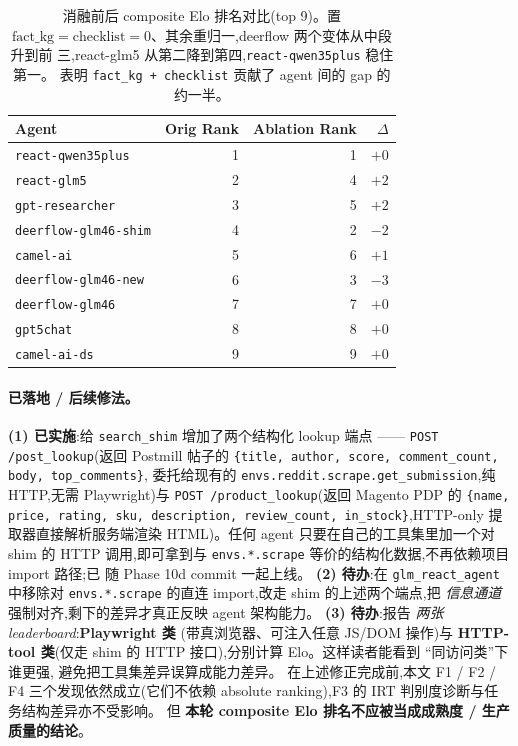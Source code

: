 \documentclass[UTF8,11pt]{ctexart}
\begin{document}
\begin{table}[h]
  \centering
  \small
  \begin{tabular}{lrrr}
    \toprule
    Agent & Orig Rank & Ablation Rank & $\Delta$ \\
    \midrule
    \texttt{react-qwen35plus}    & 1 & 1 & $+0$ \\
    \texttt{react-glm5}          & 2 & 4 & $+2$ \\
    \texttt{gpt-researcher}      & 3 & 5 & $+2$ \\
    \texttt{deerflow-glm46-shim} & 4 & 2 & $-2$ \\
    \texttt{camel-ai}            & 5 & 6 & $+1$ \\
    \texttt{deerflow-glm46-new}  & 6 & 3 & $-3$ \\
    \texttt{deerflow-glm46}      & 7 & 7 & $+0$ \\
    \texttt{gpt5chat}            & 8 & 8 & $+0$ \\
    \texttt{camel-ai-ds}         & 9 & 9 & $+0$ \\
    \bottomrule
  \end{tabular}
  \caption{消融前后 composite Elo 排名对比(top 9)。置 $\mathrm{fact\_kg}
    = \mathrm{checklist} = 0$、其余重归一,deerflow 两个变体从中段升到前
    三,react-glm5 从第二降到第四,\texttt{react-qwen35plus} 稳住第一。
    表明 \texttt{fact\_kg + checklist} 贡献了 agent 间的 gap 的约一半。}
  \label{tab:ablation}
\end{table}

\paragraph{已落地 / 后续修法。}
\textbf{(1) 已实施}:给 \texttt{search\_shim} 增加了两个结构化 lookup
端点 —— \texttt{POST /post\_lookup}(返回 Postmill 帖子的
\texttt{\{title, author, score, comment\_count, body, top\_comments\}},
委托给现有的 \texttt{envs.reddit.scrape.get\_submission},纯 HTTP,无需
Playwright)与 \texttt{POST /product\_lookup}(返回 Magento PDP 的
\texttt{\{name, price, rating, sku, description, review\_count,
in\_stock\}},HTTP-only 提取器直接解析服务端渲染 HTML)。任何 agent
只要在自己的工具集里加一个对 shim 的 HTTP 调用,即可拿到与
\texttt{envs.*.scrape} 等价的结构化数据,不再依赖项目 import 路径;已
随 Phase 10d commit 一起上线。
\textbf{(2) 待办}:在 \texttt{glm\_react\_agent} 中移除对
\texttt{envs.*.scrape} 的直连 import,改走 shim 的上述两个端点,把
\emph{信息通道} 强制对齐,剩下的差异才真正反映 agent 架构能力。
\textbf{(3) 待办}:报告 \emph{两张 leaderboard}:\textbf{Playwright 类}
(带真浏览器、可注入任意 JS/DOM 操作)与 \textbf{HTTP-tool 类}(仅走
shim 的 HTTP 接口),分别计算 Elo。这样读者能看到 ``同访问类''下谁更强,
避免把工具集差异误算成能力差异。
在上述修正完成前,本文 F1 / F2 / F4 三个发现依然成立(它们不依赖 absolute
ranking),F3 的 IRT 判别度诊断与任务结构差异亦不受影响。
但 \textbf{本轮 composite Elo 排名不应被当成成熟度 / 生产质量的结论}。
\end{document}
